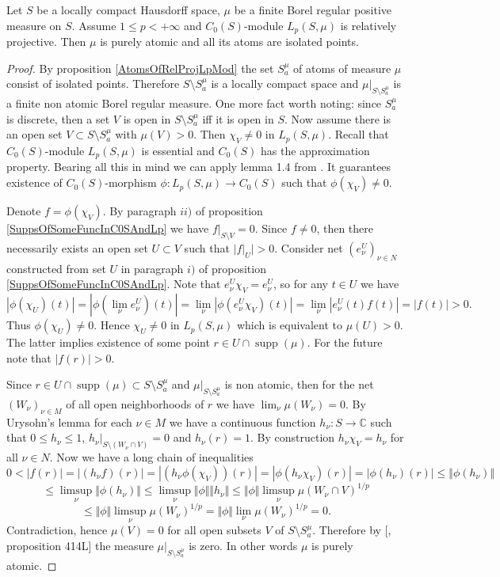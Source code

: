 \begin{proposition}\label{RelProjLpModImplsPureAtomMeas} Let $S$ be a locally compact Hausdorff space, $\mu$ be a finite Borel regular positive measure on $S$. Assume $1\leq p<+\infty$ and $C_0(S)$-module $L_p(S,\mu)$ is relatively projective. Then $\mu$ is purely atomic and all its atoms are isolated points.
\end{proposition}
\begin{proof} By proposition \ref{AtomsOfRelProjLpMod} the set $S_a^{\mu}$ of atoms of measure $\mu$ consist of isolated points. Therefore $S\setminus S_a^{\mu}$ is a locally compact space and $\mu|_{S\setminus S_a^{\mu}}$ is a finite non atomic Borel regular measure. One more fact worth noting:  since $S_a^{\mu}$ is discrete, then a set $V$ is open in $S\setminus S_a^{\mu}$ iff it is open in $S$. Now assume there is an open set $V\subset S\setminus S_a^{\mu}$ with $\mu(V)>0$. Then $\chi_V\neq 0$ in $L_p(S,\mu)$. Recall that $C_0(S)$-module $L_p(S,\mu)$ is essential and $C_0(S)$ has the approximation property. Bearing all this in mind we can apply lemma 1.4 from \cite{SelivBiproBanAlg}. It guarantees existence of $C_0(S)$-morphism $\phi:L_p(S,\mu)\to C_0(S)$ such that $\phi(\chi_V)\neq 0$. 

Denote $f=\phi(\chi_V)$. By paragraph $ii)$ of proposition \ref{SuppsOfSomeFuncInC0SAndLp} we have $f|_{S\setminus V}=0$. Since $f\neq 0$, then there necessarily exists an open set $U\subset V$ such that $|f|_U|> 0$. Consider net $(e_\nu^U)_{\nu\in N}$ constructed from set $U$ in paragraph $i)$ of proposition \ref{SuppsOfSomeFuncInC0SAndLp}. Note that $e_\nu^U\chi_V=e_\nu^U$, so for any $t\in U$ we have
$$
|\phi(\chi_U)(t)|
=|\phi(\lim_\nu e_\nu^U)(t)|
=\lim_\nu|\phi(e_\nu^U\chi_V)(t)|
=\lim_\nu |e_\nu^U(t)f(t)|=|f(t)|
>0.
$$ 
Thus $\phi(\chi_U)\neq 0$. Hence $\chi_U\neq 0$ in $L_p(S,\mu)$ which is equivalent to $\mu(U)>0$. The latter implies existence of some point $r\in U\cap\operatorname{supp}(\mu)$. For the future note that $|f(r)|>0$.

Since $r\in U\cap\operatorname{supp}(\mu)\subset S\setminus S_a^{\mu}$ and $\mu|_{S\setminus S_a^{\mu}}$ is non atomic, then for the net $(W_\nu)_{\nu\in M}$ of all open neighborhoods of $r$ we have $\lim_\nu\mu(W_\nu)=0$. By Urysohn's lemma for each $\nu\in M$ we have a continuous function $h_\nu:S\to\mathbb{C}$ such that $0\leq h_\nu\leq 1$, $h_\nu|_{S\setminus (W_\nu\cap V)}=0$ and $h_\nu(r)=1$. By construction $h_\nu\chi_V=h_\nu$ for all $\nu\in N$. Now we have a long chain of inequalities
$$
0<|f(r)|
=|(h_\nu f)(r)|
=|(h_\nu \phi(\chi_V))(r)|
=|\phi(h_\nu\chi_V)(r)|
=|\phi(h_\nu)(r)|
\leq\Vert\phi(h_\nu)\Vert
$$
$$
\leq\limsup_\nu\Vert\phi(h_\nu)\Vert
\leq\limsup_\nu\Vert\phi\Vert\Vert h_\nu\Vert
\leq\Vert\phi\Vert\limsup_\nu\mu(W_\nu\cap V)^{1/p}
$$
$$
\leq\Vert\phi\Vert\limsup_\nu\mu(W_\nu)^{1/p}
=\Vert\phi\Vert\lim_\nu\mu(W_\nu)^{1/p}
=0.
$$
Contradiction, hence $\mu(V)=0$ for all open subsets $V$ of $S\setminus S_a^{\mu}$. Therefore by [\cite{FremMeasTh}, proposition 414L] the measure $\mu|_{S\setminus S_a^{\mu}}$ is zero. In other words $\mu$ is purely atomic.
\end{proof}

